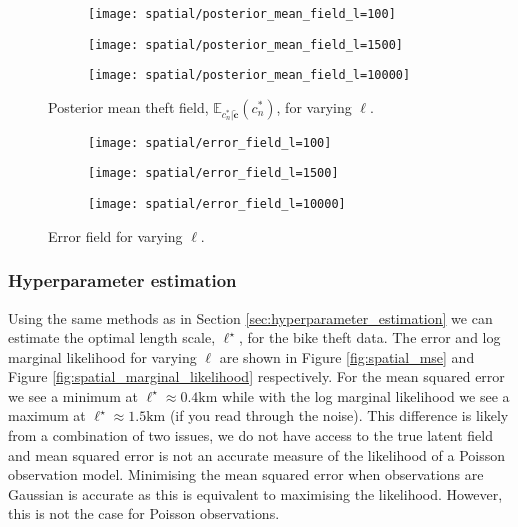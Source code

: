 \documentclass[11pt]{article}
\begin{document}
\begin{figure}
    \centering
    \begin{subfigure}{0.3\textwidth}
        \texttt{[image: spatial/posterior\_mean\_field\_l=100]}
    \end{subfigure}    
    \begin{subfigure}{0.3\textwidth}
        \texttt{[image: spatial/posterior\_mean\_field\_l=1500]}
    \end{subfigure}    
    \begin{subfigure}{0.3\textwidth}
        \texttt{[image: spatial/posterior\_mean\_field\_l=10000]}
    \end{subfigure}
    \caption{Posterior mean theft field, $\mathbb{E}_{c_n^*|\tilde{\boldsymbol{c}}}(c_n^*)$, for varying $\ell$.}
    \label{fig:posterior_mean_field}
\end{figure}

\begin{figure}
    \centering
    \begin{subfigure}{0.3\textwidth}
        \texttt{[image: spatial/error\_field\_l=100]}
    \end{subfigure}    
    \begin{subfigure}{0.3\textwidth}
        \texttt{[image: spatial/error\_field\_l=1500]}
    \end{subfigure}    
    \begin{subfigure}{0.3\textwidth}
        \texttt{[image: spatial/error\_field\_l=10000]}
    \end{subfigure}
    \caption{Error field for varying $\ell$.}
    \label{fig:error_field}
\end{figure}

\subsubsection{Hyperparameter estimation}
Using the same methods as in Section \ref{sec:hyperparameter_estimation} we can estimate the optimal length scale, $\ell^{\star}$, for the bike theft data. The error and log marginal likelihood for varying $\ell$ are shown in Figure \ref{fig:spatial_mse} and Figure \ref{fig:spatial_marginal_likelihood} respectively. For the mean squared error we see a minimum at $\ell^{\star} \approx 0.4\text{km}$ while with the log marginal likelihood we see a maximum at $\ell^{\star} \approx 1.5\text{km}$ (if you read through the noise). This difference is likely from a combination of two issues, we do not have access to the true latent field and mean squared error is not an accurate measure of the likelihood of a Poisson observation model. Minimising the mean squared error when observations are Gaussian is accurate as this is equivalent to maximising the likelihood. However, this is not the case for Poisson observations. 
\end{document}
